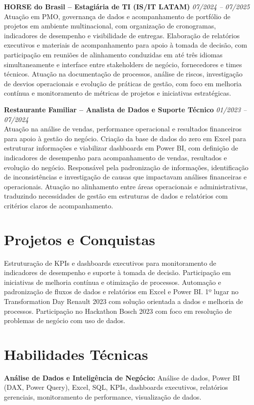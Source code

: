\documentclass[11pt,a4paper]{article}
\newcommand{\experience}[3]{%
  \textbf{#1} \hfill \textit{#2}\\[4pt]
  #3
  \vspace{8pt}
}
\begin{document}
\experience{HORSE do Brasil -- Estagiária de TI (IS/IT LATAM)}{07/2024 -- 07/2025}{%
Atuação em PMO, governança de dados e acompanhamento de portfólio de projetos em ambiente multinacional, com organização de cronogramas, indicadores de desempenho e visibilidade de entregas. Elaboração de relatórios executivos e materiais de acompanhamento para apoio à tomada de decisão, com participação em reuniões de alinhamento conduzidas em até três idiomas simultaneamente e interface entre stakeholders de negócio, fornecedores e times técnicos. Atuação na documentação de processos, análise de riscos, investigação de desvios operacionais e evolução de práticas de gestão, com foco em melhoria contínua e monitoramento de métricas de projetos e iniciativas estratégicas.}

\experience{Restaurante Familiar -- Analista de Dados e Suporte Técnico}{01/2023 -- 07/2024}{%
Atuação na análise de vendas, performance operacional e resultados financeiros para apoio à gestão do negócio. Criação da base de dados do zero em Excel para estruturar informações e viabilizar dashboards em Power BI, com definição de indicadores de desempenho para acompanhamento de vendas, resultados e evolução do negócio. Responsável pela padronização de informações, identificação de inconsistências e investigação de causas que impactavam análises financeiras e operacionais. Atuação no alinhamento entre áreas operacionais e administrativas, traduzindo necessidades de gestão em estruturas de dados e relatórios com critérios claros de acompanhamento.}

\section*{Projetos e Conquistas}

Estruturação de KPIs e dashboards executivos para monitoramento de indicadores de desempenho e suporte à tomada de decisão. Participação em iniciativas de melhoria contínua e otimização de processos. Automação e padronização de fluxos de dados e relatórios em Excel e Power BI. 1º lugar no Transformation Day Renault 2023 com solução orientada a dados e melhoria de processos. Participação no Hackathon Bosch 2023 com foco em resolução de problemas de negócio com uso de dados.

\section*{Habilidades Técnicas}

\textbf{Análise de Dados e Inteligência de Negócio:} Análise de dados, Power BI (DAX, Power Query), Excel, SQL, KPIs, dashboards executivos, relatórios gerenciais, monitoramento de performance, visualização de dados.
\end{document}
